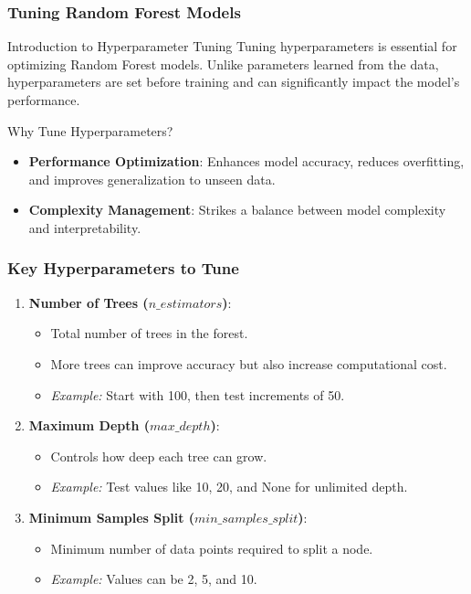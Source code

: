 \documentclass[aspectratio=169]{beamer}
\begin{document}
\begin{frame}
    \frametitle{Tuning Random Forest Models}
    \begin{block}{Introduction to Hyperparameter Tuning}
        Tuning hyperparameters is essential for optimizing Random Forest models. Unlike parameters learned from the data, hyperparameters are set before training and can significantly impact the model's performance.
    \end{block}
    
    \begin{block}{Why Tune Hyperparameters?}
        \begin{itemize}
            \item \textbf{Performance Optimization}: Enhances model accuracy, reduces overfitting, and improves generalization to unseen data.
            \item \textbf{Complexity Management}: Strikes a balance between model complexity and interpretability.
        \end{itemize}
    \end{block}
\end{frame}

\begin{frame}
    \frametitle{Key Hyperparameters to Tune}
    \begin{enumerate}
        \item \textbf{Number of Trees ($n\_estimators$)}:
            \begin{itemize}
                \item Total number of trees in the forest.
                \item More trees can improve accuracy but also increase computational cost.
                \item \textit{Example:} Start with 100, then test increments of 50.
            \end{itemize}
        \item \textbf{Maximum Depth ($max\_depth$)}:
            \begin{itemize}
                \item Controls how deep each tree can grow.
                \item \textit{Example:} Test values like 10, 20, and None for unlimited depth.
            \end{itemize}
        \item \textbf{Minimum Samples Split ($min\_samples\_split$)}:
            \begin{itemize}
                \item Minimum number of data points required to split a node.
                \item \textit{Example:} Values can be 2, 5, and 10.
            \end{itemize}
    \end{enumerate}
\end{frame}
\end{document}
